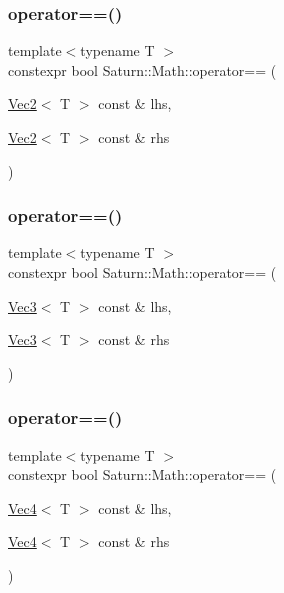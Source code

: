 \subsubsection{\texorpdfstring{operator==()}{operator==()}\hspace{0.1cm}{\footnotesize\ttfamily [2/4]}}
{\footnotesize\ttfamily template$<$typename T $>$ \\
constexpr bool Saturn\+::\+Math\+::operator== (\begin{DoxyParamCaption}\item[{\mbox{\hyperlink{namespace_saturn_1_1_math_a8befc95aeff660bda92b8807c1cc5224}{Vec2}}$<$ T $>$ const \&}]{lhs,  }\item[{\mbox{\hyperlink{namespace_saturn_1_1_math_a8befc95aeff660bda92b8807c1cc5224}{Vec2}}$<$ T $>$ const \&}]{rhs }\end{DoxyParamCaption})}

\mbox{\label{namespace_saturn_1_1_math_a22c98ba4f428e138bd2d902f58556748}} 
\subsubsection{\texorpdfstring{operator==()}{operator==()}\hspace{0.1cm}{\footnotesize\ttfamily [3/4]}}
{\footnotesize\ttfamily template$<$typename T $>$ \\
constexpr bool Saturn\+::\+Math\+::operator== (\begin{DoxyParamCaption}\item[{\mbox{\hyperlink{namespace_saturn_1_1_math_af4a7a893730c64ac02b620f648cc5406}{Vec3}}$<$ T $>$ const \&}]{lhs,  }\item[{\mbox{\hyperlink{namespace_saturn_1_1_math_af4a7a893730c64ac02b620f648cc5406}{Vec3}}$<$ T $>$ const \&}]{rhs }\end{DoxyParamCaption})}

\mbox{\label{namespace_saturn_1_1_math_a02dbf2e6adae7e40b3514e665576653e}} 
\subsubsection{\texorpdfstring{operator==()}{operator==()}\hspace{0.1cm}{\footnotesize\ttfamily [4/4]}}
{\footnotesize\ttfamily template$<$typename T $>$ \\
constexpr bool Saturn\+::\+Math\+::operator== (\begin{DoxyParamCaption}\item[{\mbox{\hyperlink{namespace_saturn_1_1_math_a311b3d690ef397050af7963caa08d1bd}{Vec4}}$<$ T $>$ const \&}]{lhs,  }\item[{\mbox{\hyperlink{namespace_saturn_1_1_math_a311b3d690ef397050af7963caa08d1bd}{Vec4}}$<$ T $>$ const \&}]{rhs }\end{DoxyParamCaption})}

